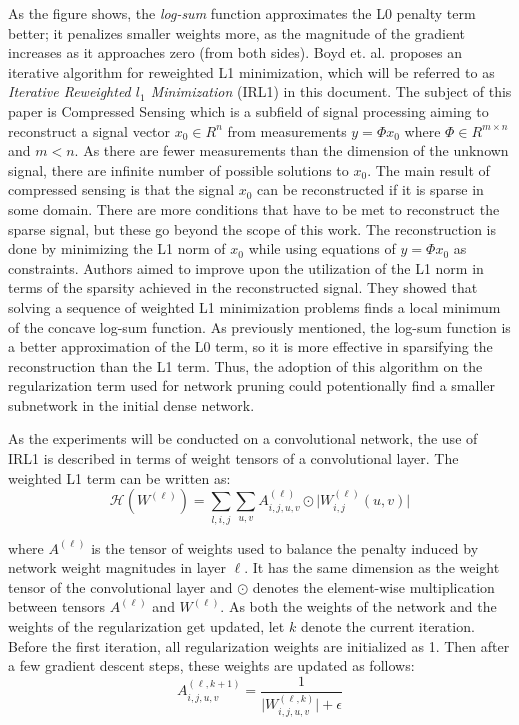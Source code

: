 As the figure shows, the \textit{log-sum} function approximates the L0 penalty term better; it penalizes smaller weights more,
 as the magnitude of the gradient increases as it approaches zero (from both sides).
Boyd et. al. \cite{boyd} proposes an iterative algorithm for reweighted L1 minimization, which will be referred to as 
\textit{Iterative Reweighted $l_1$ Minimization } (IRL1) in this document. The subject of this paper is Compressed Sensing which is a subfield 
of signal processing aiming to reconstruct a signal vector $x_0 \in R^n$ from measurements $y = \Phi x_0$ where $\Phi \in R^{m\times n}$
and $m < n$. As there are fewer measurements than the dimension of the unknown signal, there are infinite number of possible solutions to $x_0$.
The main result of compressed sensing is that the signal $x_0$ can be reconstructed if it is sparse in some domain. There are more conditions
that have to be met to reconstruct the sparse signal, but these go beyond the scope of this work. The reconstruction is done by minimizing the
L1 norm of $x_0$ while using equations of $y=\Phi x_0$ as constraints. Authors aimed to improve upon the utilization of the L1 norm in terms of the sparsity
achieved in the reconstructed signal. They showed that solving a sequence of weighted L1 minimization problems finds a local minimum of the concave log-sum
function. As previously mentioned, the log-sum function is a better approximation of the L0 term, so it is more effective in sparsifying the
reconstruction than the L1 term. Thus, the adoption of this algorithm on the regularization term used for network pruning could potentionally find a
smaller subnetwork in the initial dense network.  

As the experiments will be conducted on a convolutional network, the use of IRL1 is described in terms of weight tensors of a convolutional layer.
The weighted L1 term can be written as:   
\begin{equation}
 \mathcal{H}(W^{(\ell)}) = \sum_{l,i, j} \sum_{u,v} A^{(\ell)}_{i,j,u,v} \odot\big| W^{(\ell)}_{i,j}(u,v) \big|
\label{eq:wl1_term}
\end{equation}

where $A^{(\ell)}$ is the tensor of weights used to balance the penalty induced by network weight magnitudes in layer $\ell$. 
It has the same dimension as the weight tensor of the convolutional layer and $\odot$ denotes the element-wise multiplication between tensors
$A^{(\ell)}$ and $W^{(\ell)}$.  As both the weights of the network and the weights of the regularization get updated, let $k$ denote the current
iteration. Before the first iteration, all regularization weights are initialized as 1. Then after a few gradient descent steps, these weights
are updated as follows:
\begin{equation}
 A_{i,j,u,v}^{(\ell, k+1)} = \frac{1}{\big|W^{(\ell, k)}_{i,j,u,v} \big| + \epsilon}
\label{eq:weight_update}
\end{equation}

